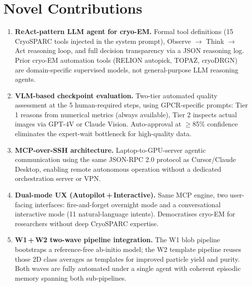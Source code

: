 \documentclass[12pt, a4paper]{article}
\begin{document}
\section{Novel Contributions}
\label{sec:contributions}

\begin{enumerate}[leftmargin=1.6em, label=\textbf{\arabic*.}, itemsep=6pt]

\item \textbf{ReAct-pattern LLM agent for cryo-EM.}
Formal tool definitions (15 CryoSPARC tools injected in the system prompt),
Observe $\to$ Think $\to$ Act reasoning loop, and full decision transparency
via a JSON reasoning log.
Prior cryo-EM automation tools (RELION autopick, TOPAZ, cryoDRGN) are
domain-specific supervised models, not general-purpose LLM reasoning agents.

\item \textbf{VLM-based checkpoint evaluation.}
Two-tier automated quality assessment at the 5 human-required steps, using
GPCR-specific prompts: Tier 1 reasons from numerical metrics (always
available), Tier 2 inspects actual images via GPT-4V or Claude Vision.
Auto-approval at $\geq$85\% confidence eliminates the expert-wait bottleneck
for high-quality data.

\item \textbf{MCP-over-SSH architecture.}
Laptop-to-GPU-server agentic communication using the same JSON-RPC 2.0
protocol as Cursor/Claude Desktop, enabling remote autonomous operation
without a dedicated orchestration server or VPN.

\item \textbf{Dual-mode UX (Autopilot\,+\,Interactive).}
Same MCP engine, two user-facing interfaces: fire-and-forget overnight mode
and a conversational interactive mode (11 natural-language intents).
Democratises cryo-EM for researchers without deep CryoSPARC expertise.

\item \textbf{W1\,+\,W2 two-wave pipeline integration.}
The W1 blob pipeline bootstraps a reference-free ab-initio model; the W2
template pipeline reuses those 2D class averages as templates for improved
particle yield and purity.
Both waves are fully automated under a single agent with coherent episodic
memory spanning both sub-pipelines.

\end{enumerate}
\end{document}
